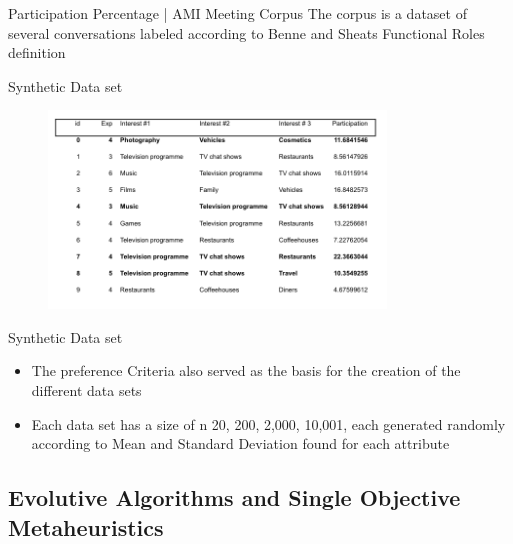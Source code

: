 \documentclass{beamer}
\begin{document}
\begin{frame}{Participation Percentage | AMI Meeting Corpus}
        The corpus \cite{carletta2005ami} is a dataset of several conversations labeled according to Benne and Sheats Functional Roles definition \cite{benne1948functional}
    \end{frame}
    
    \begin{frame}{Synthetic Data set}
        \begin{figure}
            \centering
            \includegraphics[width=0.8\textwidth]{images/dataset.png}
        \end{figure}
    \end{frame}
    \begin{frame}{Synthetic Data set}
        \begin{itemize}
            \item The preference Criteria also served as the basis for the creation of the different data sets
            \item Each data set has a size of n {20, 200, 2,000, 10,001}, each generated randomly according to Mean and Standard Deviation found for each attribute
        \end{itemize}
    \end{frame}
    
    \subsection{Evolutive Algorithms and Single Objective Metaheuristics}
    
\end{document}
